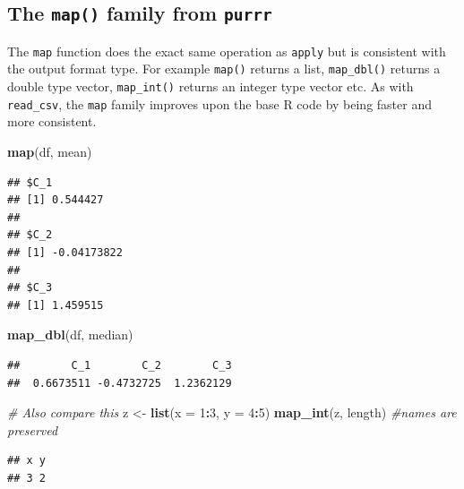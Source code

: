 \documentclass[12pt,]{article}
\newenvironment{Shaded}{\begin{snugshade}}{\end{snugshade}}
\newcommand{\KeywordTok}[1]{\textcolor[rgb]{0.13,0.29,0.53}{\textbf{#1}}}
\newcommand{\DataTypeTok}[1]{\textcolor[rgb]{0.13,0.29,0.53}{#1}}
\newcommand{\DecValTok}[1]{\textcolor[rgb]{0.00,0.00,0.81}{#1}}
\newcommand{\StringTok}[1]{\textcolor[rgb]{0.31,0.60,0.02}{#1}}
\newcommand{\CommentTok}[1]{\textcolor[rgb]{0.56,0.35,0.01}{\textit{#1}}}
\newcommand{\OperatorTok}[1]{\textcolor[rgb]{0.81,0.36,0.00}{\textbf{#1}}}
\newcommand{\NormalTok}[1]{#1}
\begin{document}
\subsection{\texorpdfstring{The \texttt{map()} family from
\texttt{purrr}}{The map() family from purrr}}\label{the-map-family-from-purrr}

The \texttt{map} function does the exact same operation as
\texttt{apply} but is consistent with the output format type. For
example \texttt{map()} returns a list, \texttt{map\_dbl()} returns a
double type vector, \texttt{map\_int()} returns an integer type vector
etc. As with \texttt{read\_csv}, the \texttt{map} family improves upon
the base R code by being faster and more consistent.

\begin{Shaded}
\begin{Highlighting}[]
\KeywordTok{map}\NormalTok{(df, mean)}
\end{Highlighting}
\end{Shaded}

\begin{verbatim}
## $C_1
## [1] 0.544427
## 
## $C_2
## [1] -0.04173822
## 
## $C_3
## [1] 1.459515
\end{verbatim}

\begin{Shaded}
\begin{Highlighting}[]
\KeywordTok{map_dbl}\NormalTok{(df, median)}
\end{Highlighting}
\end{Shaded}

\begin{verbatim}
##        C_1        C_2        C_3 
##  0.6673511 -0.4732725  1.2362129
\end{verbatim}

\begin{Shaded}
\begin{Highlighting}[]
\CommentTok{# Also compare this}
\NormalTok{z <-}\StringTok{ }\KeywordTok{list}\NormalTok{(}\DataTypeTok{x =} \DecValTok{1}\OperatorTok{:}\DecValTok{3}\NormalTok{, }\DataTypeTok{y =} \DecValTok{4}\OperatorTok{:}\DecValTok{5}\NormalTok{)}
\KeywordTok{map_int}\NormalTok{(z, length) }\CommentTok{#names are preserved}
\end{Highlighting}
\end{Shaded}

\begin{verbatim}
## x y 
## 3 2
\end{verbatim}
\end{document}
